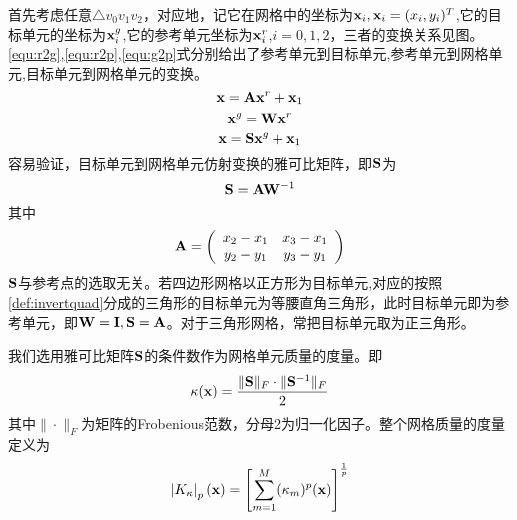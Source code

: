首先考虑任意$\triangle v_0v_1v_2$，对应地，记它在网格中的坐标为$\mathbf{x}_i,\mathbf{x}_i=(x_i,y_i)^T$,它的目标单元的坐标为$\mathbf{x}^g_i$,它的参考单元坐标为$\mathbf{x}^r_i$,$i=0,1,2$，三者的变换关系见图。\ref{equ:r2g},\ref{equ:r2p},\ref{equ:g2p}式分别给出了参考单元到目标单元,参考单元到网格单元,目标单元到网格单元的变换。
\begin{equation}\label{equ:r2g}
\mathbf{x}=\mathbf{A} \mathbf{x}^r+\mathbf{x}_1
\end{equation}
\begin{equation}\label{equ:r2p}
\mathbf{x}^g=\mathbf{W} \mathbf{x}^r
\end{equation}
\begin{equation}\label{equ:g2p}
\mathbf{x}=\mathbf{S} \mathbf{x}^g+\mathbf{x}_1
\end{equation}
容易验证，目标单元到网格单元仿射变换的雅可比矩阵，即$\mathbf{S}$为
\begin{equation}\label{equ:aff-jacob}
\mathbf{S}=\mathbf{A} \mathbf{W}{^{-1}}
\end{equation}
其中
\begin{equation} \label{equ:affA}
\mathbf{A}=
\left(
\begin{array}{cc}
x_2-x_1 & x_3-x_1 \\ 
y_2-y_1 & y_3-y_1
\end{array} 
\right)
\end{equation}
$\mathbf{S}$与参考点的选取无关。若四边形网格以正方形为目标单元,对应的按照\ref{def:invertquad}分成的三角形的目标单元为等腰直角三角形，此时目标单元即为参考单元，即$\mathbf{W}=\mathbf{I},\mathbf{S}=\mathbf{A}$。对于三角形网格，常把目标单元取为正三角形。

我们选用雅可比矩阵$\mathbf{S}$的条件数作为网格单元质量的度量。即
\begin{equation}\label{equ:Jac-condition}
\kappa(\mathbf{x})=\frac{\|\mathbf{S}\|_F \cdot \|\mathbf{S}^{-1}\|_F}{2}
\end{equation}
其中$\|\cdot\|_F$为矩阵的Frobenious范数，分母2为归一化因子。整个网格质量的度量定义为
\begin{equation}\label{equ:mesh-metric}
\left|K_{\kappa}\right|_p(\mathbf{x})=\left[\sum_{m=1}^M(\kappa_m)^p(\mathbf{x})\right]^{\frac{1}{p}}
\end{equation}
